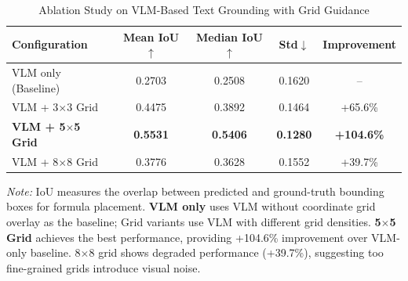 
\begin{table}[t]
    \centering
    \caption{Ablation Study on VLM-Based Text Grounding with Grid Guidance}
    \label{tab:text_grounding}
    \small
    \begin{tabular}{lcccc}
    \toprule
    \textbf{Configuration} & \textbf{Mean IoU$\uparrow$} & \textbf{Median IoU$\uparrow$} & \textbf{Std$\downarrow$} & \textbf{Improvement} \\
    \midrule
    VLM only (Baseline) & 0.2703 & 0.2508 & 0.1620 & -- \\
    \midrule
    VLM + 3$\times$3 Grid & 0.4475 & 0.3892 & 0.1464 & +65.6\% \\
    \rowcolor{gray!15}
    \textbf{VLM + 5$\times$5 Grid} & \textbf{0.5531} & \textbf{0.5406} & \textbf{0.1280} & \textbf{+104.6\%} \\
    VLM + 8$\times$8 Grid & 0.3776 & 0.3628 & 0.1552 & +39.7\% \\
    \bottomrule
    \end{tabular}
    \vspace{4pt}
    \begin{minipage}{0.95\linewidth}
    \footnotesize
    \textit{Note:} IoU measures the overlap between predicted and ground-truth bounding boxes for formula placement. 
    \textbf{VLM only} uses VLM without coordinate grid overlay as the baseline; Grid variants use VLM with different grid densities.
    \textbf{5$\times$5 Grid} achieves the best performance, providing +104.6\% improvement over VLM-only baseline.
    8$\times$8 grid shows degraded performance (+39.7\%), suggesting too fine-grained grids introduce visual noise.
    \end{minipage}
    \end{table}
